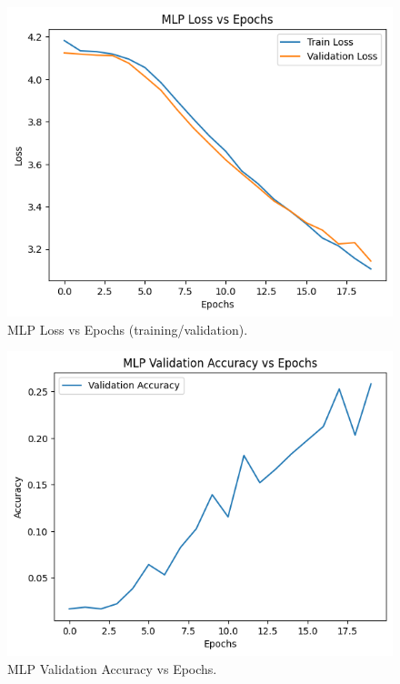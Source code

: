 \documentclass[11pt,a4paper]{article}
\begin{document}
\begin{figure}[H]
  \centering
  \includegraphics[width=0.75\linewidth]{MLP_images/mlp_loss.png}
  \caption{MLP Loss vs Epochs (training/validation).}
  \label{fig:mlp_loss}
\end{figure}

\begin{figure}[H]
  \centering
  \includegraphics[width=0.75\linewidth]{MLP_images/mlp_acc.png}
  \caption{MLP Validation Accuracy vs Epochs.}
  \label{fig:mlp_val_acc}
\end{figure}
\end{document}
